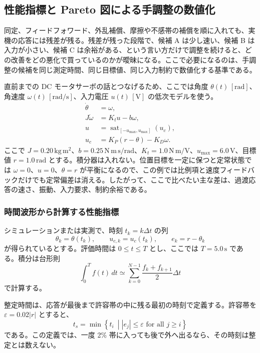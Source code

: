 \subsection{性能指標と Pareto 図による手調整の数値化}

同定、フィードフォワード、外乱補償、摩擦や不感帯の補償を順に入れても、実機の応答には残差が残る。残差が残った段階で、候補 A は少し速い、候補 B は入力が小さい、候補 C は余裕がある、という言い方だけで調整を続けると、どの改善をどの悪化で買っているのかが曖昧になる。ここで必要になるのは、手調整の候補を同じ測定時間、同じ目標値、同じ入力制約で数値化する基準である。

直前までの DC モータサーボの話とつなげるため、ここでは角度 $\theta(t)\,[\mathrm{rad}]$、角速度 $\omega(t)\,[\mathrm{rad/s}]$、入力電圧 $u(t)\,[\mathrm{V}]$ の低次モデルを使う。
\begin{align}
  \dot{\theta}&=\omega,\\
  J\dot{\omega}&=K_tu-b\omega,\\
  u&=\operatorname{sat}_{[-u_{\max},u_{\max}]}(u_c),\\
  u_c&=K_P(r-\theta)-K_D\omega .
  \label{eq:performance-motor-model}
\end{align}
ここで $J=0.20\,\mathrm{kg\,m^2}$、$b=0.25\,\mathrm{N\,m\,s/rad}$、$K_t=1.0\,\mathrm{N\,m/V}$、$u_{\max}=6.0\,\mathrm{V}$、目標値 $r=1.0\,\mathrm{rad}$ とする。積分器は入れない。位置目標を一定に保つと定常状態では $\omega=0$、$u=0$、$\theta=r$ が平衡になるので、この例では比例項と速度フィードバックだけでも定常偏差は消える。したがって、ここで比べたい主な差は、過渡応答の速さ、振動、入力要求、制約余裕である。

\subsubsection{時間波形から計算する性能指標}

シミュレーションまたは実測で、時刻 $t_k=k\Delta t$ の列
\begin{equation}
  \theta_k=\theta(t_k),\qquad
  u_{c,k}=u_c(t_k),\qquad
  e_k=r-\theta_k
\end{equation}
が得られているとする。評価時間は $0\leq t\leq T$ とし、ここでは $T=5.0\,\mathrm{s}$ である。積分は台形則
\begin{equation}
  \int_0^T f(t)\,dt
  \simeq
  \sum_{k=0}^{N-1}
  \frac{f_k+f_{k+1}}{2}\Delta t
  \label{eq:performance-trapezoid}
\end{equation}
で計算する。

整定時間は、応答が最後まで許容帯の中に残る最初の時刻で定義する。許容帯を $\varepsilon=0.02|r|$ とすると、
\begin{equation}
  t_s=
  \min\left\{
  t_i\ \middle|
  |e_j|\leq \varepsilon
  \text{ for all } j\geq i
  \right\}
  \label{eq:settling-time-definition}
\end{equation}
である。この定義では、一度 2\% 帯に入っても後で外へ出るなら、その時刻は整定とは数えない。

